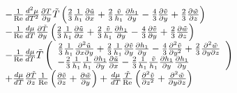 \begin{equation*}
\begin{array}{l}
 \quad \; - \frac{1}{{{\mathop{\rm Re}\nolimits} }}\frac{{d^2 \mu }}{{dT^2 }}\frac{{\partial T}}{{\partial y}}\tilde T\left( {\frac{2}{3}\frac{1}{{h_1 }}\frac{{\partial \tilde u}}{{\partial x}} + \frac{2}{3}\frac{{\tilde v}}{{h_1 }}\frac{{\partial h_1 }}{{\partial y}} - \frac{4}{3}\frac{{\partial \tilde v}}{{\partial y}} + \frac{2}{3}\frac{{\partial \tilde w}}{{\partial z}}} \right) \\
 \quad \; - \frac{1}{{{\mathop{\rm Re}\nolimits} }}\frac{{d\mu }}{{dT}}\frac{{\partial \tilde T}}{{\partial y}}\left( {\frac{2}{3}\frac{1}{{h_1 }}\frac{{\partial \tilde u}}{{\partial x}} + \frac{2}{3}\frac{{\tilde v}}{{h_1 }}\frac{{\partial h_1 }}{{\partial y}} - \frac{4}{3}\frac{{\partial \tilde v}}{{\partial y}} + \frac{2}{3}\frac{{\partial \tilde w}}{{\partial z}}} \right) \\
 \quad \; - \frac{1}{{{\mathop{\rm Re}\nolimits} }}\frac{{d\mu }}{{dT}}\tilde T\left( \begin{array}{l}
 \frac{2}{3}\frac{1}{{h_1 }}\frac{{\partial ^2 \tilde u}}{{\partial x\partial y}} + \frac{2}{3}\frac{1}{{h_1 }}\frac{{\partial \tilde v}}{{\partial y}}\frac{{\partial h_1 }}{{\partial y}} - \frac{4}{3}\frac{{\partial ^2 \tilde v}}{{\partial y^2 }} + \frac{2}{3}\frac{{\partial ^2 \tilde w}}{{\partial y\partial z}} \\
  - \frac{2}{3}\frac{1}{{h_1 }}\frac{1}{{h_1 }}\frac{{\partial h_1 }}{{\partial y}}\frac{{\partial \tilde u}}{{\partial x}} - \frac{2}{3}\frac{1}{{h_1 }}\frac{{\tilde v}}{{h_1 }}\frac{{\partial h_1 }}{{\partial y}}\frac{{\partial h_1 }}{{\partial y}} \\
 \end{array} \right) \\
 \quad \; + \frac{{d\mu }}{{dT}}\frac{{\partial \tilde T}}{{\partial z}}\frac{1}{{{\mathop{\rm Re}\nolimits} }}\left( {\frac{{\partial \tilde v}}{{\partial z}} + \frac{{\partial \tilde w}}{{\partial y}}} \right) + \frac{{d\mu }}{{dT}}\frac{{\tilde T}}{{{\mathop{\rm Re}\nolimits} }}\left( {\frac{{\partial ^2 \tilde v}}{{\partial z^2 }} + \frac{{\partial ^2 \tilde w}}{{\partial y\partial z}}} \right) \\
 \end{array}
\end{equation*}
